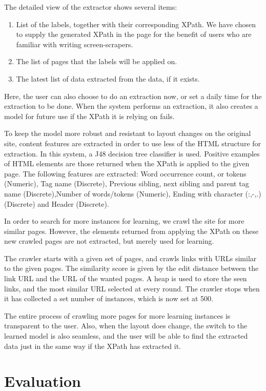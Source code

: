 \documentclass[a4paper,12pt]{nurop}
\begin{document}
 The detailed view of the extractor shows several items:
 \begin{enumerate}
 	\item List of the labels, together with their corresponding XPath.
 	We have chosen to supply the generated XPath in the page for the benefit
	of users who are familiar with writing screen-scrapers.
 	\item The list of pages that the labels will be applied on.
 	\item The latest list of data extracted from the data, if it exists.
 \end{enumerate}

Here, the user can also choose to do an extraction now, or set a daily time for the extraction
to be done. When the system performs an extraction, it also creates a model for future use if
the XPath it is relying on fails.

To keep the model more robust and resistant to layout changes on the original site,
content features are extracted in order to use less of the HTML structure for extraction.
In this system, a J48 decision tree classifier is used. Positive examples of HTML elements
are those returned when the XPath is applied to the given page. The following features are extracted:
Word occurrence count, or tokens (Numeric), Tag name (Discrete),
Previous sibling, next sibling and parent tag name (Discrete),Number of words/tokens (Numeric),
Ending with character (:,-,.) (Discrete) and Header (Discrete).

In order to search for more instances for learning, we crawl the site for more similar pages.
However, the elements returned from applying the XPath on these new crawled pages are not extracted,
but merely used for learning.

The crawler starts with a given set of pages, and crawls links with URLs similar
to the given pages. The similarity score is given by the edit distance between the link URL
and the URL of the wanted pages. A heap is used to store the seen links, and the most similar
URL selected at every round. The crawler stops when it has collected a set number of instances,
which is now set at 500.

The entire process of crawling more pages for more learning instances is transparent to the user.
Also, when the layout does change, the switch to the learned model is also seamless, and the 
user will be able to find the extracted data just in the same way if the XPath has extracted it.

\section{Evaluation}
\end{document}
